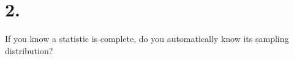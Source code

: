 \section{2.}

If you know a statistic is complete, do you automatically know its sampling distribution?


